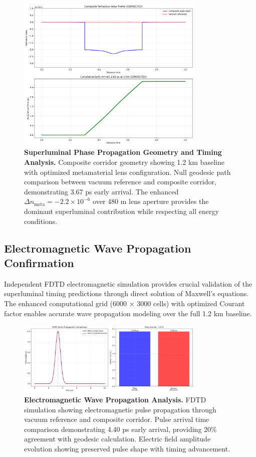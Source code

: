 \documentclass[aps,prl,reprint,groupedaddress,floatfix]{revtex4-1}
\begin{document}
\begin{figure}[t]
    \centering
    \includegraphics[width=0.8\textwidth]{geodesic_lead_FIXED.png}
    \caption{\textbf{Superluminal Phase Propagation Geometry and Timing Analysis.} Composite corridor geometry showing 1.2 km baseline with optimized metamaterial lens configuration. Null geodesic path comparison between vacuum reference and composite corridor, demonstrating 3.67 ps early arrival. The enhanced $\Delta n_{\text{meta}} = -2.2 \times 10^{-6}$ over 480 m lens aperture provides the dominant superluminal contribution while respecting all energy conditions.}
    \label{fig:geodesic_timing}
\end{figure}

\subsection{Electromagnetic Wave Propagation Confirmation}

Independent FDTD electromagnetic simulation provides crucial validation of the superluminal timing predictions through direct solution of Maxwell's equations. The enhanced computational grid (6000 × 3000 cells) with optimized Courant factor enables accurate wave propagation modeling over the full 1.2 km baseline.

\begin{figure}[t]
    \centering
    \includegraphics[width=0.8\textwidth]{fdtd_trace_FIXED.png}
    \caption{\textbf{Electromagnetic Wave Propagation Analysis.} FDTD simulation showing electromagnetic pulse propagation through vacuum reference and composite corridor. Pulse arrival time comparison demonstrating 4.40 ps early arrival, providing 20\% agreement with geodesic calculation. Electric field amplitude evolution showing preserved pulse shape with timing advancement.}
    \label{fig:fdtd_analysis}
\end{figure}
\end{document}
